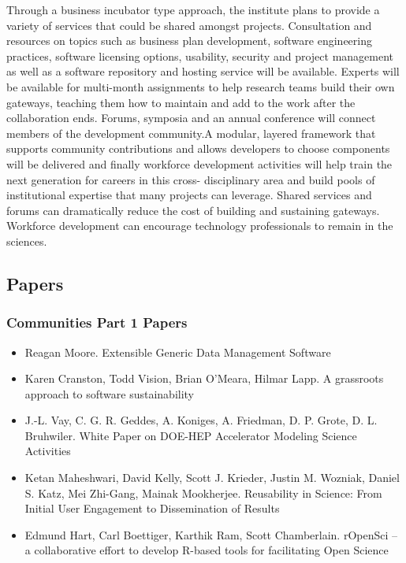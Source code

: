 \documentclass[11pt, oneside]{amsart}
\begin{document}
Through a business incubator type approach, the institute plans to provide a variety of services that could be shared amongst
projects. Consultation and resources on topics such as business plan development, software engineering practices, 
software licensing options, usability, security and project management as well as a software repository and hosting 
service will be available. Experts will be available for multi-month assignments to help research teams build their own gateways,
teaching them how to maintain and add to the work after the collaboration ends. Forums, symposia and an annual conference
will connect members of the development community.A modular, layered framework that supports community contributions and 
allows developers to choose components will be delivered and finally 
workforce development activities will help train the next generation for careers in this cross- disciplinary area and 
build pools of institutional expertise that many projects can leverage. Shared services and forums can dramatically reduce the cost
of building and sustaining gateways. Workforce development can encourage technology professionals to remain in the sciences.


\subsection{Papers}

\subsubsection*{Communities Part 1 Papers}

\begin{itemize}

\item Reagan Moore. Extensible Generic Data Management Software \cite{Moore_WSSSPE}

\item Karen Cranston, Todd Vision, Brian O'Meara, Hilmar Lapp. A grassroots approach to software sustainability \cite{Cranston_WSSSPE}

\item J.-L. Vay, C. G. R. Geddes, A. Koniges, A. Friedman, D. P. Grote, D. L. Bruhwiler. White Paper on DOE-HEP Accelerator Modeling Science Activities \cite{Vay_WSSSPE}

\item Ketan Maheshwari, David Kelly, Scott J. Krieder, Justin M. Wozniak, Daniel S. Katz, Mei Zhi-Gang, Mainak Mookherjee. Reusability in Science: From Initial User Engagement to Dissemination of Results \cite{Maheshwari_WSSSPE}

\item Edmund Hart, Carl Boettiger, Karthik Ram, Scott Chamberlain. rOpenSci -- a collaborative effort to develop R-based tools for facilitating Open Science \cite{Hart_WSSSPE}

\end{itemize}
\end{document}
